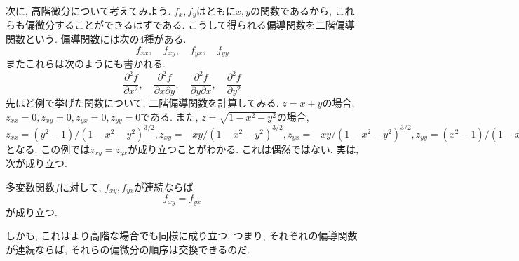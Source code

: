         次に, 高階微分について考えてみよう. $f_x,f_y$はともに$x,y$の関数であるから, これらも偏微分することができるはずである. こうして得られる偏導関数を二階偏導関数という.
        偏導関数には次の4種がある.
        \begin{equation*}
            f_{xx},\quad f_{xy},\quad f_{yx},\quad f_{yy} 
        \end{equation*}
        またこれらは次のようにも書かれる.
        \begin{equation*}
            \frac{\partial^2 f}{\partial x^2},\quad \frac{\partial^2 f}{\partial x\partial y},\quad \frac{\partial^2 f}{\partial y\partial x},\quad \frac{\partial^2 f}{\partial y^2}
        \end{equation*}
        先ほど例で挙げた関数について, 二階偏導関数を計算してみる. $z=x+y$の場合, $z_{xx}=0,z_{xy}=0,z_{yx}=0,z_{yy}=0$である. また, $z=\sqrt{1-x^2-y^2}$の場合, $z_{xx}=(y^2-1)/(1-x^2-y^2)^{3/2},z_{xy}=-xy/(1-x^2-y^2)^{3/2},z_{yx}=-xy/(1-x^2-y^2)^{3/2},z_{yy}=(x^2-1)/(1-x^2-y^2)^{3/2}$となる.
        この例では$z_{xy}=z_{yx}$が成り立つことがわかる. これは偶然ではない. 実は, 次が成り立つ.
        \begin{screen}
            多変数関数$f$に対して, $f_{xy},f_{yx}$が連続ならば
            \begin{equation}
                f_{xy}=f_{yx} \label{eq:偏微分:偏微分の交換}
            \end{equation}
            が成り立つ.
        \end{screen}
        しかも, これはより高階な場合でも同様に成り立つ. つまり, それぞれの偏導関数が連続ならば, それらの偏微分の順序は交換できるのだ.

